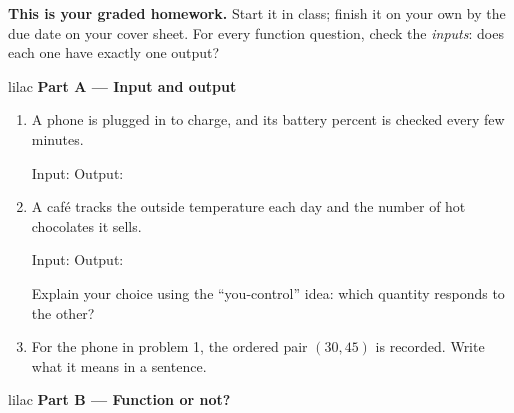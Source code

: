 \documentclass[10pt]{article}
\begin{document}

\vspace{0.12in}

\boxguard[8]
\begin{remindbox}
\small
\textbf{This is your graded homework.} Start it in class; finish it on your own by the due
date on your cover sheet. For every function question, check the \emph{inputs}: does each one
have exactly one output?
\end{remindbox}

\vspace{0.12in}

\begin{headlinebox}{lilac}
\textbf{\color{plum}Part A --- Input and output}
\end{headlinebox}

\begin{enumerate}[leftmargin=1.9em, itemsep=8pt]

\item A phone is plugged in to charge, and its battery percent is checked every few minutes.

      Input: \blank{4.2cm} \qquad Output: \blank{4.2cm}

\item A café tracks the outside temperature each day and the number of hot chocolates it sells.

      Input: \blank{4.2cm} \qquad Output: \blank{4.2cm}

      Explain your choice using the ``you-control'' idea: which quantity responds to the other?
      \writespace{1.1cm}{}

\item For the phone in problem 1, the ordered pair $(30, 45)$ is recorded. Write what it means in
      a sentence.
      \writespace{1.1cm}{}

\end{enumerate}

\vspace{0.1in}

\begin{headlinebox}{lilac}
\textbf{\color{plum}Part B --- Function or not?}
\end{headlinebox}
\end{document}
